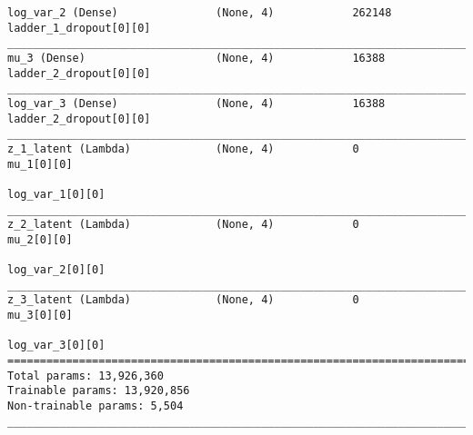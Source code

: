 \begin{lstlisting}[caption={dSprites-VLAE Encoder},captionpos=b,basicstyle=\tiny, label={lst:dsprites-vlae-encoder}]
log_var_2 (Dense)               (None, 4)            262148      ladder_1_dropout[0][0]
__________________________________________________________________________________________________
mu_3 (Dense)                    (None, 4)            16388       ladder_2_dropout[0][0]
__________________________________________________________________________________________________
log_var_3 (Dense)               (None, 4)            16388       ladder_2_dropout[0][0]
__________________________________________________________________________________________________
z_1_latent (Lambda)             (None, 4)            0           mu_1[0][0]
                                                                 log_var_1[0][0]
__________________________________________________________________________________________________
z_2_latent (Lambda)             (None, 4)            0           mu_2[0][0]
                                                                 log_var_2[0][0]
__________________________________________________________________________________________________
z_3_latent (Lambda)             (None, 4)            0           mu_3[0][0]
                                                                 log_var_3[0][0]
==================================================================================================
Total params: 13,926,360
Trainable params: 13,920,856
Non-trainable params: 5,504
__________________________________________________________________________________________________
\end{lstlisting}